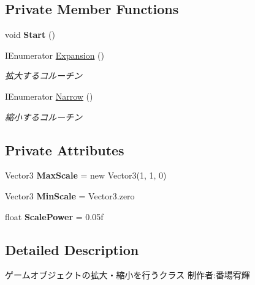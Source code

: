 \subsection*{Private Member Functions}
\begin{DoxyCompactItemize}
\item 
\mbox{\label{class_change_scale_aff84f3a23fb4a87a1636b96ba77e256f}} 
void {\bfseries Start} ()
\item 
I\+Enumerator \hyperlink{class_change_scale_a6ea53bd612343b4516bd0c870b0de350}{Expansion} ()
\begin{DoxyCompactList}\small\item\em 拡大するコルーチン \end{DoxyCompactList}\item 
I\+Enumerator \hyperlink{class_change_scale_a96b187f4826b4713f05788c440b4eb41}{Narrow} ()
\begin{DoxyCompactList}\small\item\em 縮小するコルーチン \end{DoxyCompactList}\end{DoxyCompactItemize}
\subsection*{Private Attributes}
\begin{DoxyCompactItemize}
\item 
\mbox{\label{class_change_scale_a70c4cdd04c4d558fb8df9f351e1c65dc}} 
Vector3 {\bfseries Max\+Scale} = new Vector3(1, 1, 0)
\item 
\mbox{\label{class_change_scale_acda920801d5374dac50db21a50db9e05}} 
Vector3 {\bfseries Min\+Scale} = Vector3.\+zero
\item 
\mbox{\label{class_change_scale_aab885a7e19d477b3ec0e61d50cabf8b7}} 
float {\bfseries Scale\+Power} = 0.\+05f
\end{DoxyCompactItemize}


\subsection{Detailed Description}
ゲームオブジェクトの拡大・縮小を行うクラス 制作者\+:番場宥輝 



